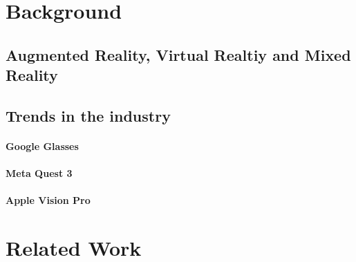 %


\section{Background}

\subsection{Augmented Reality, Virtual Realtiy and Mixed Reality}

\subsection{Trends in the industry}

\paragraph{Google Glasses}

\paragraph{Meta Quest 3}

\paragraph{Apple Vision Pro}


\section{Related Work}
